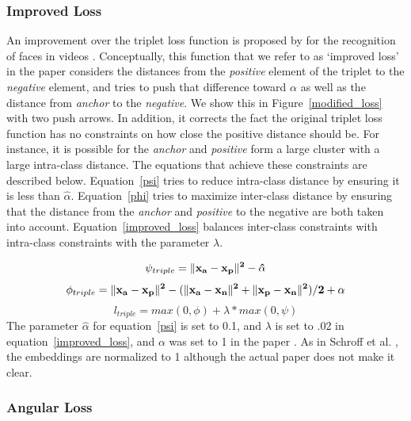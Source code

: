 \subsubsection{Improved Loss}

 An improvement over the triplet loss function is proposed by
 \cite{DBLP:conf/cvpr/SchroffKP15} for the recognition of faces in
 videos \cite{Zhang:2016:DML:3088616.3088665}.  Conceptually, this
 function that we refer to as `improved loss' in the paper considers
 the distances from the \textit{positive} element of the triplet to
 the \textit{negative} element, and tries to push that
 difference toward $\alpha$ as well as the distance from
 \textit{anchor} to the \textit{negative}.  We show this in
 Figure~\ref{modified_loss} with two push arrows.  In addition, it corrects the fact the  original triplet loss function has no constraints on how close the positive distance should be.  For instance, it is possible for the \textit{anchor} and \textit{positive} form a large cluster with a large intra-class distance. The equations that achieve these constraints are described below.  Equation~\ref{psi} tries to reduce intra-class distance by ensuring it is less than $\hat{\alpha}$.  Equation~\ref{phi} tries to maximize inter-class distance by ensuring that the distance from the \textit{anchor} and \textit{positive} to the negative are both taken into account.  Equation~\ref{improved_loss} balances inter-class constraints with intra-class constraints with the parameter $\lambda$. 

\begin{equation}
  \psi_{triple} = \|\bf{x_{a}} - \bf{x_{p}}\|^2 - \hat{\alpha}
\label{psi}
\end{equation}
\begin{equation}
  \phi_{triple} = \|\bf{x_{a}} - \bf{x_{p}}\|^2 - (\|\bf{x_{a}}- \bf{x_{n}}\|^2 + \|\bf{x_{p}} - \bf{x_{n}}\|^2) / 2  + \alpha
\label{phi}
\end{equation}
\begin{equation}
  l_{triple} = max(0, \phi) + \lambda * max(0, \psi)
\label{improved_loss}
\end{equation}
The parameter $\hat{\alpha}$ for equation~\ref{psi} is set to 0.1, and $\lambda$ is set to .02 in equation~\ref{improved_loss}, and $\alpha$ was set to 1 in the paper \cite{Zhang:2016:DML:3088616.3088665}.  As in Schroff et al. \cite{DBLP:conf/cvpr/SchroffKP15}, the embeddings are normalized to 1 although the actual paper does not make it clear.

\subsubsection{Angular Loss}

